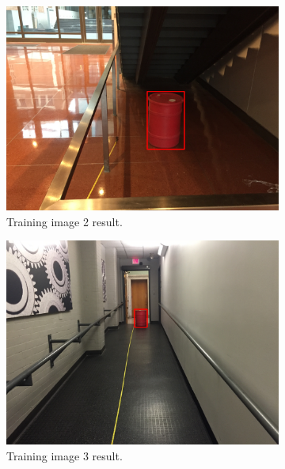 \documentclass[a4paper]{article}
\begin{document}
\begin{figure}[!tbp]
  \centering
  \begin{subfigure}[b]{.4\textwidth}
    \includegraphics[width=1\textwidth]{train_image2.png}
\caption{\label{fig:train2}Training image 2 result.}
  \end{subfigure}
  \begin{subfigure}[b]{.4\textwidth}
    \includegraphics[width=1\textwidth]{train_image3.png}
\caption{\label{fig:train3}Training image 3 result.}
  \end{subfigure}
  \caption{\label{fig:train1_set}}
\end{figure}
\end{document}
